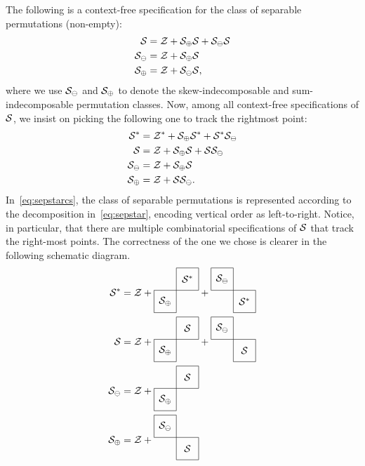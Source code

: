 \documentclass[12pt, a4paper, twoside]{report}
\begin{document}
\begin{example}
  \label{ex:separable_combspec}
  The following is a context-free specification for the class of separable permutations (non-empty):
  \begin{align*}
    \S &= \Z + \S_{\oplus}\S + \S_{\ominus}\S\\
    \S_{\ominus} &= \Z + \S_\oplus\S\\
    \S_\oplus &= \Z + \S_\ominus\S,
  \end{align*}
  where we use $\S_\ominus$ and $\S_\oplus$ to denote the skew-indecomposable and sum-indecomposable permutation classes. Now, among all context-free specifications of $\S$, we insist on picking the following one to track the rightmost point:
  \begin{align}
    \begin{aligned}
    \S^* &= \Z^* + \S_{\oplus}\S^* + \S^*\S_{\ominus}\\
    \S &= \Z + \S_{\oplus}\S + \S\S_{\ominus}\\
    \S_{\ominus} &= \Z + \S_\oplus\S\\
    \S_\oplus &= \Z + \S\S_\ominus.
    \label{eq:sepstarcs}
  \end{aligned}
  \end{align}
  In~\eqref{eq:sepstarcs}, the class of separable permutations is represented according to the decomposition in~\eqref{eq:sepstar}, encoding vertical order as left-to-right. Notice, in particular, that there are multiple combinatorial specifications of $\S$ that track the right-most points. The correctness of the one we chose is clearer in the following schematic diagram.
  \begin{align}
    \begin{aligned}
      \S^* &= \Z + \cplusc{\S_\oplus}{\S^*} + \cminusc{\S^*}{\S_\ominus}\\
      \S &= \Z + \cplusc{\S_\oplus}{\S} + \cminusc{\S}{\S_\ominus}\\
      \S_\ominus &= \Z + \cplusc{\S_\oplus}{\S}\\
      \S_\oplus &= \Z + \cminusc{\S}{\S_\ominus}
    \end{aligned}
                  \label{eq:sepstar}
  \end{align}


\end{example}
\end{document}
